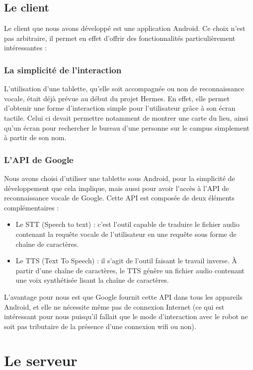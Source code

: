 \documentclass{report}
\begin{document}
    \subsection{Le client}
    {Le client que nous avons développé est une application Android. Ce choix n'est
    pas arbitraire, il permet en effet d'offrir des fonctionnalités particulièrement
    intéressantes :}

    \subsubsection{La simplicité de l'interaction}
    {L'utilisation d'une tablette, qu'elle soit accompagnée ou non de reconnaissance
    vocale, était déjà prévue au début du projet Hermes. En effet, elle permet
    d'obtenir une forme d'interaction simple pour l'utilisateur grâce à son écran tactile.
    Celui ci devait permettre notamment de montrer une carte du lieu, ainsi qu'un écran
    pour rechercher le bureau d'une personne sur le campus simplement à partir de son
    nom.}

    \subsubsection{L'API de Google}
    {Nous avons choisi d'utiliser une tablette sous Android, pour la simplicité de
    développement que cela implique, mais aussi pour avoir l'accès à l'API de reconnaissance
    vocale de Google. Cette API est composée de deux éléments complémentaires :}
    \begin{itemize}
      \item Le STT (Speech to text) : c'est l'outil capable de traduire le fichier
      audio contenant la requête vocale de l'utilisateur en une requête sous forme de
      chaîne de caractères.
      \item Le TTS (Text To Speech) : il s'agit de l'outil faisant le travail inverse.
      À partir d'une chaîne de caractères, le TTS génère un fichier audio contenant une
      voix synthétisée lisant la chaîne de caractères.
    \end{itemize}

    {L'avantage pour nous est que Google fournit cette API dans tous les appareils
    Android, et elle ne nécessite même pas de connexion Internet (ce qui est intéressant
    pour nous puisqu'il fallait que le mode d'interaction avec le robot ne soit pas
    tributaire de la présence d'une connexion wifi ou non).}

    \section{Le serveur}
\end{document}
